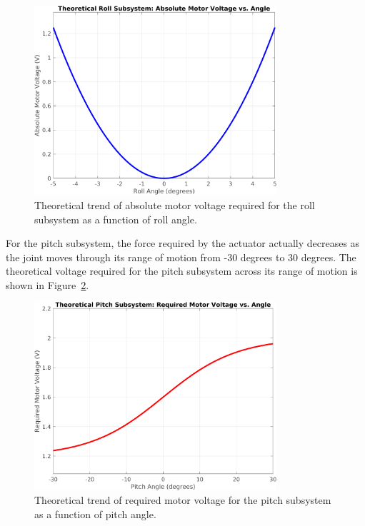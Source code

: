\begin{figure}[htbp]
    \centering
    \includegraphics[width=0.8\textwidth]{figures/Roll_Subsystem_Theoretical_Trend.png}
    \caption{Theoretical trend of absolute motor voltage required for the roll subsystem as a function of roll angle.}
    \label{fig:roll_voltage_trend}
\end{figure}

For the pitch subsystem, the force required by the actuator actually decreases as the joint moves through its range of motion from -30 degrees to 30 degrees. The theoretical voltage required for the pitch subsystem across its range of motion is shown in Figure~\ref{fig:pitch_voltage_trend}.

\begin{figure}[htbp]
    \centering
\includegraphics[width=0.8\textwidth]{figures/Pitch_Subsystem_Theoretical_Trend.png}
    \caption{Theoretical trend of required motor voltage for the pitch subsystem as a function of pitch angle.}
    \label{fig:pitch_voltage_trend}
\end{figure}

